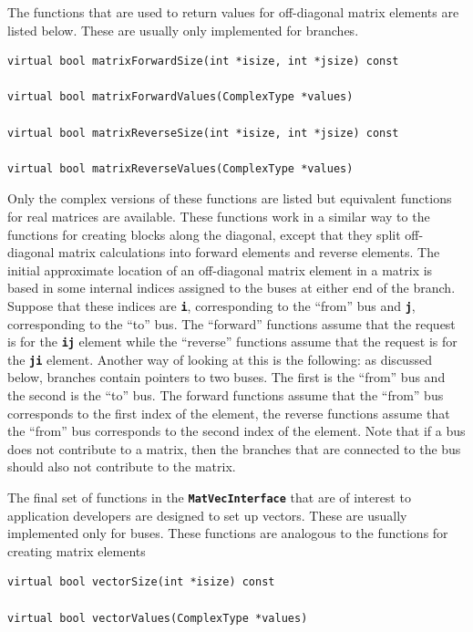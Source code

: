 The functions that are used to return values for off-diagonal matrix elements are listed below. These are usually only implemented for branches.

{
\color{red}
\begin{Verbatim}[fontseries=b]
virtual bool matrixForwardSize(int *isize, int *jsize) const

virtual bool matrixForwardValues(ComplexType *values)

virtual bool matrixReverseSize(int *isize, int *jsize) const

virtual bool matrixReverseValues(ComplexType *values)
\end{Verbatim}
}

Only the complex versions of these functions are listed but equivalent functions for real matrices are available. These functions work in a similar way to the functions for creating blocks along the diagonal, except that they split off-diagonal matrix calculations into forward elements and reverse elements. The initial approximate location of an off-diagonal matrix element in a matrix is based in some internal indices assigned to the buses at either end of the branch. Suppose that these indices are \texttt{\textbf{i}}, corresponding to the ``from'' bus and \texttt{\textbf{j}}, corresponding to the ``to'' bus. The ``forward'' functions assume that the request is for the \texttt{\textbf{ij}} element while the ``reverse'' functions assume that the request is for the \texttt{\textbf{ji}} element. Another way of looking at this is the following: as discussed below, branches contain pointers to two buses. The first is the ``from'' bus and the second is the ``to'' bus. The forward functions assume that the ``from'' bus corresponds to the first index of the element, the reverse functions assume that the ``from'' bus corresponds to the second index of the element. Note that if a bus does not contribute to a matrix, then the branches that are connected to the bus should also not contribute to the matrix.

The final set of functions in the \texttt{\textbf{MatVecInterface}} that are of interest to application developers are designed to set up vectors. These are usually implemented only for buses. These functions are analogous to the functions for creating matrix elements

{
\color{red}
\begin{Verbatim}[fontseries=b]
virtual bool vectorSize(int *isize) const

virtual bool vectorValues(ComplexType *values)
\end{Verbatim}
}


